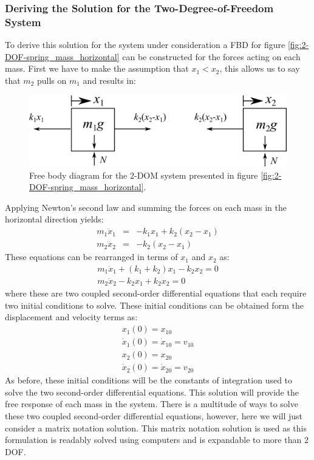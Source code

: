 \documentclass[12pt,letter]{article}
\numberwithin{ex}{section} %
\numberwithin{re}{section} %
\begin{document}
\subsubsection{Deriving the Solution for the Two-Degree-of-Freedom System}
\label{sec:2-DOF_derive_solution}
To derive this solution for the system under consideration a FBD for figure \ref{fig:2-DOF-spring_mass_horizontal} can be constructed for the forces acting on each mass. First we have to make the assumption that $x_1 < x_2$, this allows us to say that $m_2$ pulls on $m_1$ and results in:
\begin{figure}[H]
	\centering
	\includegraphics[]{../Figures/2-DOF-spring_mass_horizontal_FBD.png}
	\caption{Free body diagram for the 2-DOM system presented in figure \ref{fig:2-DOF-spring_mass_horizontal}.}
	\label{fig:2-DOF-spring_mass_horizontal_FBD}
\end{figure}
\noindent Applying Newton's second law and summing the forces on each mass in the horizontal direction yields:
\begin{eqnarray}
m_1\ddot{x}_1 &= & -k_1x_1 + k_2(x_2-x_1) \\
m_2\ddot{x}_2&= & -k_2(x_2-x_1)  \nonumber
\end{eqnarray}
These equations can be rearranged in terms of  $x_1$ and $x_2$ as:
\begin{eqnarray}
m_1\ddot{x}_1 +(k_1+k_2)x_1 -k_2x_2 =0 \\
m_2\ddot{x}_2 - k_2x_1 + k_2x_2 = 0 \nonumber
\end{eqnarray}
where these are two coupled second-order differential equations that each require two initial conditions to solve. These initial conditions can be obtained form the displacement and velocity terms as:
\begin{eqnarray}
x_1(0) = x_{10} \\
\dot{x}_1(0) = \dot{x}_{10} = v_{10} \nonumber \\ 
x_2(0) = x_{20} \nonumber \\ 
\dot{x}_2(0) = \dot{x}_{20} = v_{20} \nonumber
\end{eqnarray}
As before, these initial conditions will be the constants of integration used to solve the two second-order differential equations. This solution will provide the free response of each mass in the system. There is a multitude of ways to solve these two coupled  second-order differential equations, however, here we will just consider a matrix notation solution. This matrix notation solution is used as this formulation is readably solved using computers and is expandable to more than 2 DOF.
\end{document}
